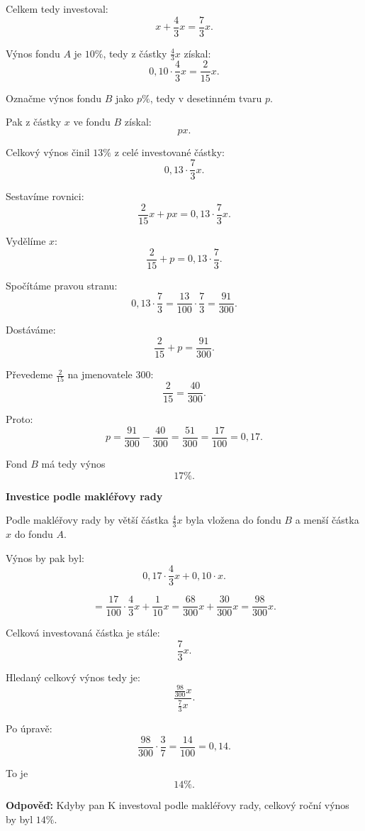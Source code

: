 \documentclass[12pt,a4paper]{article}
\begin{document}
Celkem tedy investoval:
\[
x+\frac{4}{3}x=\frac{7}{3}x.
\]

\medskip

Výnos fondu \(A\) je \(10\%\), tedy z částky \(\frac{4}{3}x\) získal:
\[
0{,}10\cdot \frac{4}{3}x=\frac{2}{15}x.
\]

Označme výnos fondu \(B\) jako \(p\%\), tedy v desetinném tvaru \(p\).

Pak z částky \(x\) ve fondu \(B\) získal:
\[
px.
\]

Celkový výnos činil \(13\%\) z celé investované částky:
\[
0{,}13\cdot \frac{7}{3}x.
\]

Sestavíme rovnici:
\[
\frac{2}{15}x + px = 0{,}13\cdot \frac{7}{3}x.
\]

Vydělíme \(x\):
\[
\frac{2}{15}+p = 0{,}13\cdot \frac{7}{3}.
\]

Spočítáme pravou stranu:
\[
0{,}13\cdot \frac{7}{3}=\frac{13}{100}\cdot \frac{7}{3}=\frac{91}{300}.
\]

Dostáváme:
\[
\frac{2}{15}+p=\frac{91}{300}.
\]

Převedeme \(\frac{2}{15}\) na jmenovatele 300:
\[
\frac{2}{15}=\frac{40}{300}.
\]

Proto:
\[
p=\frac{91}{300}-\frac{40}{300}=\frac{51}{300}=\frac{17}{100}=0{,}17.
\]

Fond \(B\) má tedy výnos
\[
17\%.
\]

\bigskip

\textbf{Investice podle makléřovy rady}

Podle makléřovy rady by větší částka \(\frac{4}{3}x\) byla vložena do fondu \(B\) a menší částka \(x\) do fondu \(A\).

Výnos by pak byl:
\[
0{,}17\cdot \frac{4}{3}x + 0{,}10\cdot x.
\]

\[
=\frac{17}{100}\cdot \frac{4}{3}x+\frac{1}{10}x
=\frac{68}{300}x+\frac{30}{300}x
=\frac{98}{300}x.
\]

Celková investovaná částka je stále:
\[
\frac{7}{3}x.
\]

Hledaný celkový výnos tedy je:
\[
\frac{\frac{98}{300}x}{\frac{7}{3}x}.
\]

Po úpravě:
\[
\frac{98}{300}\cdot \frac{3}{7}
=\frac{14}{100}=0{,}14.
\]

To je
\[
14\%.
\]

\bigskip

\textbf{Odpověď:}  
Kdyby pan K investoval podle makléřovy rady, celkový roční výnos by byl \(14\%\).




\newpage
\end{document}
